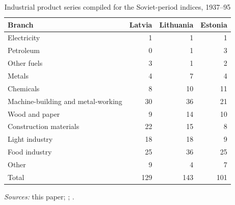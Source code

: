 \begin{table}[htbp]
\centering\footnotesize
\caption{Industrial product series compiled for the Soviet-period indices, 1937--95}
\label{tab:products}
\begin{threeparttable}
\begin{tabular}{lrrr}
\toprule
Branch & Latvia & Lithuania & Estonia \\
\midrule
Electricity & 1 & 1 & 1 \\
Petroleum & 0 & 1 & 3 \\
Other fuels & 3 & 1 & 2 \\
Metals & 4 & 7 & 4 \\
Chemicals & 8 & 10 & 11 \\
Machine-building and metal-working & 30 & 36 & 21 \\
Wood and paper & 9 & 14 & 10 \\
Construction materials & 22 & 15 & 8 \\
Light industry & 18 & 18 & 9 \\
Food industry & 25 & 36 & 25 \\
Other & 9 & 4 & 7 \\
\midrule
Total & 129 & 143 & 101 \\
\bottomrule
\end{tabular}
\begin{tablenotes}
\footnotesize
\textit{Sources:} this paper; \textcite{klimantas2026soviet}; \textcite{klimantas2025estonia}.
\end{tablenotes}
\end{threeparttable}
\end{table}
